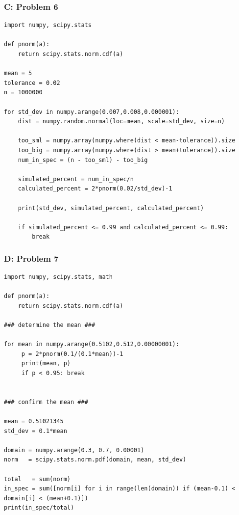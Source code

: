 \documentclass[11pt]{extarticle}
\begin{document}
\subsubsection*{C: Problem 6}

\scriptsize
\begin{verbatim}
import numpy, scipy.stats

def pnorm(a):
    return scipy.stats.norm.cdf(a)

mean = 5
tolerance = 0.02
n = 1000000

for std_dev in numpy.arange(0.007,0.008,0.000001):
    dist = numpy.random.normal(loc=mean, scale=std_dev, size=n)

    too_sml = numpy.array(numpy.where(dist < mean-tolerance)).size
    too_big = numpy.array(numpy.where(dist > mean+tolerance)).size
    num_in_spec = (n - too_sml) - too_big

    simulated_percent = num_in_spec/n
    calculated_percent = 2*pnorm(0.02/std_dev)-1

    print(std_dev, simulated_percent, calculated_percent) 

    if simulated_percent <= 0.99 and calculated_percent <= 0.99: 
        break 
\end{verbatim}
\normalsize


\subsubsection*{D: Problem 7}

\scriptsize
\begin{verbatim}
import numpy, scipy.stats, math 

def pnorm(a):
    return scipy.stats.norm.cdf(a)

### determine the mean ###

for mean in numpy.arange(0.5102,0.512,0.00000001):
     p = 2*pnorm(0.1/(0.1*mean))-1 
     print(mean, p) 
     if p < 0.95: break
     
     
### confirm the mean ###

mean = 0.51021345
std_dev = 0.1*mean

domain = numpy.arange(0.3, 0.7, 0.00001)
norm   = scipy.stats.norm.pdf(domain, mean, std_dev)

total   = sum(norm)
in_spec = sum([norm[i] for i in range(len(domain)) if (mean-0.1) < domain[i] < (mean+0.1)])
print(in_spec/total)
\end{verbatim}
\normalsize




\clearpage
\doublespacing


\end{document}
